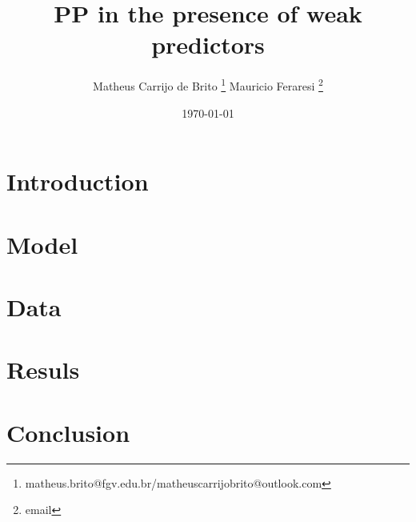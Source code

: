 \documentclass[12pt]{article}
\begin{document}
\begin{titlepage}
\title{PP in the presence of weak predictors}
\author{Matheus Carrijo de Brito \thanks{matheus.brito@fgv.edu.br/matheuscarrijobrito@outlook.com} \quad Mauricio Feraresi \thanks{email}}
\date{\today}
\maketitle

\begin{abstract}






\bigskip
\end{abstract}
\setcounter{page}{0}
\thispagestyle{empty}
\end{titlepage}

\pagebreak \newpage

\doublespacing


\section{Introduction} \label{sec:introduction}


\section{Model} \label{sec:modelo} 

\section{Data} \label{sec:data} 

\section{Resuls} \label{sec:results}

\section{Conclusion} \label{sec:conclusion}
\end{document}
